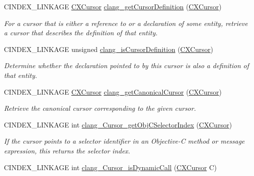 \begin{DoxyCompactItemize}
C\+I\+N\+D\+E\+X\+\_\+\+L\+I\+N\+K\+A\+GE \mbox{\hyperlink{structCXCursor}{C\+X\+Cursor}} \mbox{\hyperlink{group__CINDEX__CURSOR__XREF_gafcfbec461e561bf13f1e8540bbbd655b}{clang\+\_\+get\+Cursor\+Definition}} (\mbox{\hyperlink{structCXCursor}{C\+X\+Cursor}})
\begin{DoxyCompactList}\small\item\em For a cursor that is either a reference to or a declaration of some entity, retrieve a cursor that describes the definition of that entity. \end{DoxyCompactList}\item 
\mbox{\label{group__CINDEX__CURSOR__XREF_ga6ad05634a73e693217088eaa693f0010}} 
C\+I\+N\+D\+E\+X\+\_\+\+L\+I\+N\+K\+A\+GE unsigned \mbox{\hyperlink{group__CINDEX__CURSOR__XREF_ga6ad05634a73e693217088eaa693f0010}{clang\+\_\+is\+Cursor\+Definition}} (\mbox{\hyperlink{structCXCursor}{C\+X\+Cursor}})
\begin{DoxyCompactList}\small\item\em Determine whether the declaration pointed to by this cursor is also a definition of that entity. \end{DoxyCompactList}\item 
C\+I\+N\+D\+E\+X\+\_\+\+L\+I\+N\+K\+A\+GE \mbox{\hyperlink{structCXCursor}{C\+X\+Cursor}} \mbox{\hyperlink{group__CINDEX__CURSOR__XREF_gac802826668be9fd40a017523cc7d24fe}{clang\+\_\+get\+Canonical\+Cursor}} (\mbox{\hyperlink{structCXCursor}{C\+X\+Cursor}})
\begin{DoxyCompactList}\small\item\em Retrieve the canonical cursor corresponding to the given cursor. \end{DoxyCompactList}\item 
C\+I\+N\+D\+E\+X\+\_\+\+L\+I\+N\+K\+A\+GE int \mbox{\hyperlink{group__CINDEX__CURSOR__XREF_ga3ea92edf682a5a734e5f4d0c2217f0b8}{clang\+\_\+\+Cursor\+\_\+get\+Obj\+C\+Selector\+Index}} (\mbox{\hyperlink{structCXCursor}{C\+X\+Cursor}})
\begin{DoxyCompactList}\small\item\em If the cursor points to a selector identifier in an Objective-\/C method or message expression, this returns the selector index. \end{DoxyCompactList}\item 
C\+I\+N\+D\+E\+X\+\_\+\+L\+I\+N\+K\+A\+GE int \mbox{\hyperlink{group__CINDEX__CURSOR__XREF_gad1e793914af7b7bf286d58a34e90ab6c}{clang\+\_\+\+Cursor\+\_\+is\+Dynamic\+Call}} (\mbox{\hyperlink{structCXCursor}{C\+X\+Cursor}} C)

\end{DoxyCompactItemize}
